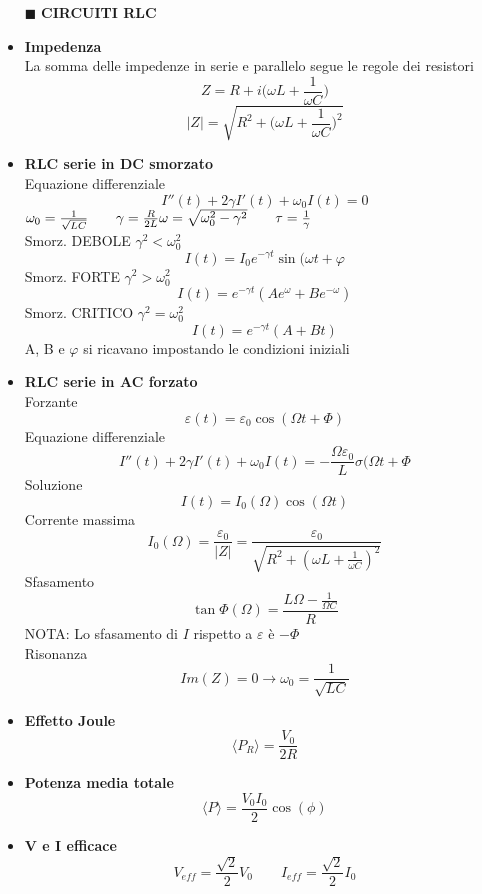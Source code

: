 \documentclass{book}
\newcommand{\g}{\textbf}
\newcommand{\e}{\begin{equation}}
\newcommand{\ex}{\end{equation} }
\renewcommand{\it}{\item[$\cdot$]}
\begin{document}
\begin{multicols}{4}
\begin{itemize}
\item [$\blacksquare$] \g{CIRCUITI RLC}
    \it \g{Impedenza} \\
    La somma delle impedenze in serie e parallelo segue le regole dei resistori
    \e{Z=R+i\biggl(\omega L+\frac{1}{\omega C}\biggr)} \ex
    \e{|Z|=\sqrt{R^2+\biggl(\omega L+\frac{1}{\omega C}\biggr)^2}} \ex
    \it \g{RLC serie in DC smorzato} \\
    Equazione differenziale
    \e{I''(t)+2\gamma I'(t)+\omega_0 I(t)=0} \ex
    $\omega_0=\frac{1}{\sqrt{LC}} \qquad \gamma=\frac{R}{2L} \\
    \omega=\sqrt{\omega_0^2-\gamma^2} \qquad \tau=\frac{1}{\gamma}$ \\
    Smorz. DEBOLE $\gamma^2<\omega_0^2$
    \e{I(t)=I_0 e^{-\gamma t} \sin(\omega t+\varphi} \ex
    Smorz. FORTE $\gamma^2>\omega_0^2$
    \e{I(t)=e^{-\gamma t}(Ae^\omega+Be^{-\omega})} \ex
    Smorz. CRITICO $\gamma^2=\omega_0^2$
    \e{I(t)=e^{-\gamma t}(A+Bt)} \ex
    A, B e $\varphi$ si ricavano impostando le condizioni iniziali
    \it \g{RLC serie in AC forzato} \\
    Forzante
    \e{\varepsilon(t)=\varepsilon_0\cos(\Omega t + \Phi)} \ex
    Equazione differenziale
    \e{I''(t)+2\gamma I'(t)+\omega_0 I(t)=-\frac{\Omega\varepsilon_0}{L}\sigma(\Omega t + \Phi} \ex
    Soluzione
    \e{I(t)=I_0(\Omega)\cos(\Omega t )} \ex
    Corrente massima
    \e{I_0(\Omega)=\frac{\varepsilon_0}{|Z|}=\frac{\varepsilon_0}{\sqrt{R^2+(\omega L+\frac{1}{\omega C})^2}}} \ex
    Sfasamento
    \e{\tan\Phi(\Omega)=\frac{L\Omega-\frac{1}{\Omega C}}{R}} \ex
    NOTA: Lo sfasamento di $I$ rispetto a $\varepsilon$ è $-\Phi$ \\
    Risonanza
    \e{Im(Z)=0 \rightarrow \omega_0=\frac{1}{\sqrt{LC}}} \ex
    \it \g{Effetto Joule}
    \e{\langle P_R\rangle=\frac{V_0}{2R}} \ex
    \it \g{Potenza media totale}
    \e{\langle P\rangle=\frac{V_0I_0}{2}\cos(\phi)} \ex
    \it \g{V e I efficace}
    \e{V_{eff}=\frac{\sqrt{2}}{2}V_0 \qquad I_{eff}=\frac{\sqrt{2}}{2}I_0} \ex


\end{itemize}
\end{multicols}
\end{document}
